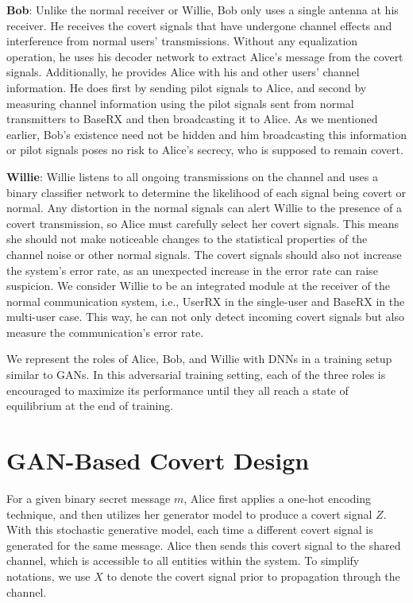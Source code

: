 \textbf{Bob}: Unlike the normal receiver or Willie, Bob only uses a single antenna at his receiver. He receives the covert signals that have undergone channel effects and interference from normal users' transmissions. Without any equalization operation, he uses his decoder network to extract Alice's message from the covert signals. Additionally, he provides Alice with his and other users' channel information. He does first by sending pilot signals to Alice, and second by measuring channel information using the pilot signals sent from normal transmitters to BaseRX and then broadcasting it to Alice. As we mentioned earlier, Bob's existence need not be hidden and him broadcasting this information or pilot signals poses no risk to Alice's secrecy, who is supposed to remain covert.

\textbf{Willie}: Willie listens to all ongoing transmissions on the channel and uses a binary classifier network to determine the likelihood of each signal being covert or normal. Any distortion in the normal signals can alert Willie to the presence of a covert transmission, so Alice must carefully select her covert signals. This means she should not make noticeable changes to the statistical properties of the channel noise or other normal signals. The covert signals should also not increase the system's error rate, as an unexpected increase in the error rate can raise suspicion. We consider Willie to be an integrated module at the receiver of the normal communication system, i.e., UserRX in the single-user and BaseRX in the multi-user case. This way, he can not only detect incoming covert signals but also measure the communication's error rate.

We represent the roles of Alice, Bob, and Willie with DNNs in a training setup similar to GANs. In this adversarial training setting, each of the three roles is encouraged to maximize its performance until they all reach a state of equilibrium at the end of training.

\section{GAN-Based Covert Design}
For a given binary secret message \(m\), Alice first applies a one-hot encoding technique, and then utilizes her generator model to produce a covert signal \(Z\). With this stochastic generative model, each time a different covert signal is generated for the same message. Alice then sends this covert signal to the shared channel, which is accessible to all entities within the system. To simplify notations, we use \(\hat{X}\) to denote the covert signal prior to propagation through the channel.


